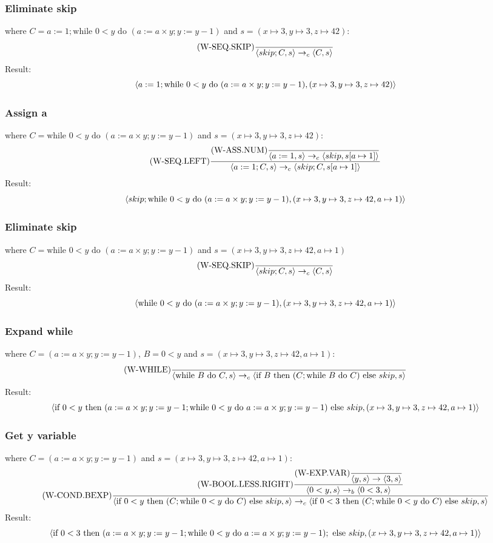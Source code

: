 \documentclass{report}
\begin{document}
\subsubsection*{Eliminate skip}
where $C = a:= 1;\text{while }0<y \text{ do } (a:= a \times y; y:= y - 1)$ and $s = (x \mapsto 3, y \mapsto 3, z \mapsto 42)$:
\[\text{(W-SEQ.SKIP)}\dfrac{}{\langle skip;C, s \rangle \to_c \langle C, s \rangle}\]
Result:
\[\langle a:= 1;\text{while }0<y \text{ do } (a:= a \times y; y:= y - 1), (x \mapsto 3, y \mapsto 3, z \mapsto 42) \rangle\]
\subsubsection*{Assign a}
where $C = \text{while }0<y \text{ do } (a:= a \times y; y:= y - 1)$ and $s = (x \mapsto 3, y \mapsto 3, z \mapsto 42)$:
\[\text{(W-SEQ.LEFT)}\dfrac{
		\text{(W-ASS.NUM)}\dfrac{}{\langle a := 1, s \rangle \to_c \langle skip, s[a \mapsto 1] \rangle}
	}{\langle a:=1;C, s \rangle \to_c \langle skip;C, s[a \mapsto 1] \rangle}\]
Result:
\[\langle skip;\text{while }0<y \text{ do } (a:= a \times y; y:= y - 1), (x \mapsto 3, y \mapsto 3, z \mapsto 42, a \mapsto 1) \rangle\]
\subsubsection*{Eliminate skip}
where $C = \text{while }0<y \text{ do } (a:= a \times y; y:= y - 1)$ and $s = (x \mapsto 3, y \mapsto 3, z \mapsto 42, a \mapsto 1)$
\[\text{(W-SEQ.SKIP)}\dfrac{}{\langle skip;C, s \rangle \to_c \langle C, s \rangle}\]
Result:
\[\langle \text{while }0<y \text{ do } (a:= a \times y; y:= y - 1), (x \mapsto 3, y \mapsto 3, z \mapsto 42, a \mapsto 1) \rangle\]
\subsubsection*{Expand while}
where $C = (a:= a \times y; y:= y - 1)$, $B = 0<y$ and $s = (x \mapsto 3, y \mapsto 3, z \mapsto 42, a \mapsto 1)$:
\[\text{(W-WHILE)}\dfrac{}{\langle \text{while } B \text{ do } C, s \rangle \to_c \langle \text{if } B \text{ then } (C; \text{while } B \text{ do } C) \text{ else } skip, s \rangle}\]
Result:
\[\langle \text{if } 0<y \text{ then } (a:= a \times y; y:= y - 1; \text{while } 0<y \text{ do } a:= a \times y; y:= y - 1) \text{ else } skip, (x \mapsto 3, y \mapsto 3, z \mapsto 42, a \mapsto 1) \rangle\]
\subsubsection*{Get y variable}
where $C = (a:= a \times y; y:= y - 1)$ and $s = (x \mapsto 3, y \mapsto 3, z \mapsto 42, a \mapsto 1)$:
\[\text{(W-COND.BEXP)}\dfrac{
		\text{(W-BOOL.LESS.RIGHT)}\dfrac{
			\text{(W-EXP.VAR)}\dfrac{}{\langle y, s \rangle \to \langle 3, s \rangle}
		}{\langle 0<y, s \rangle \to_b \langle 0<3, s \rangle}
	}{\langle \text{if } 0<y \text{ then } (C; \text{while } 0<y \text{ do } C) \text{ else } skip, s \rangle \to_c \langle \text{if } 0<3 \text{ then } (C; \text{while } 0<y \text{ do } C) \text{ else } skip, s \rangle}\]
Result:
\[\langle \text{if } 0<3 \text{ then } (a:= a \times y; y:= y - 1; \text{while } 0<y \text{ do } a:= a \times y; y:= y - 1); \text{ else } skip, (x \mapsto 3, y \mapsto 3, z \mapsto 42, a \mapsto 1) \rangle\]
\end{document}
